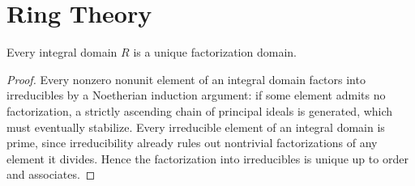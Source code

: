 \section{Ring Theory}

\begin{theorem}
Every integral domain $R$ is a unique factorization domain.
\end{theorem}

\begin{proof}
Every nonzero nonunit element of an integral domain factors into
irreducibles by a Noetherian induction argument: if some element admits no
factorization, a strictly ascending chain of principal ideals is
generated, which must eventually stabilize. Every irreducible element of
an integral domain is prime, since irreducibility already rules out
nontrivial factorizations of any element it divides. Hence the
factorization into irreducibles is unique up to order and associates.
\end{proof}
